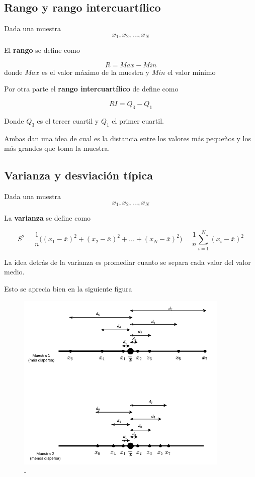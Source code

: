 \documentclass[]{article}
\theoremstyle{plain}
\theoremstyle{definition}
\theoremstyle{definition} %
\begin{document}
\hypertarget{rango-y-rango-intercuartuxedlico}{%
\subsection{Rango y rango
intercuartílico}\label{rango-y-rango-intercuartuxedlico}}

Dada una muestra \[ x_1, x_2, \ldots , x_N\]

El \textbf{rango} se define como

\[R= Max - Min\] donde \(Max\) es el valor máximo de la muestra y
\(Min\) el valor mínimo

Por otra parte el \textbf{rango intercuartílico} de define como

\[RI =  Q_3 - Q_1\]

Donde \(Q_3\) es el tercer cuartil y \(Q_1\) el primer cuartil.

Ambas dan una idea de cual es la distancia entre los valores más
pequeños y los más grandes que toma la muestra.

\hypertarget{varianza-y-desviaciuxf3n-tuxedpica}{%
\subsection{Varianza y desviación
típica}\label{varianza-y-desviaciuxf3n-tuxedpica}}

Dada una muestra \[ x_1, x_2, \ldots , x_N\]

La \textbf{varianza} se define como

\[S^2 = \frac{1}{n}\big( (x_1 - \overline x)^2 + (x_2 - \overline x)^2 + \ldots + (x_N - \overline x)^2 \big)= \frac{1}{n}\sum^N_{i=1} (x_i - \overline x)^2\]

La idea detrás de la varianza es promediar cuanto se separa cada valor
del valor medio.

Esto se aprecia bien en la siguiente figura

\begin{figure}
\centering
\includegraphics[width=4in,height=\textheight]{img/desviaciones_diagrama.drawio.png}
\caption{-}
\end{figure}
\end{document}
